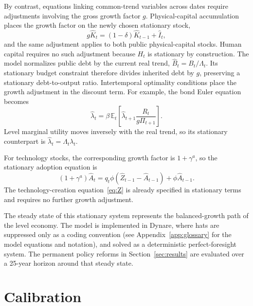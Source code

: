 \documentclass[a4paper,11pt]{article}
\begin{document}
By contrast, equations linking common-trend variables across dates require adjustments involving the gross growth factor $g$.
Physical-capital accumulation places the growth factor on the newly chosen stationary stock,
\begin{equation} \label{eq:capstat}
    g\hat{K}_t=(1-\delta)\hat{K}_{t-1}+\hat{I}_t,
\end{equation}
and the same adjustment applies to both public physical-capital stocks.
Human capital requires no such adjustment because $H_t$ is stationary by construction.
The model normalizes public debt by the current real trend, $\hat B_t=B_t/\Lambda_t$.
Its stationary budget constraint therefore divides inherited debt by $g$, preserving a stationary debt-to-output ratio.
Intertemporal optimality conditions place the growth adjustment in the discount term.
For example, the bond Euler equation becomes
\begin{equation} \label{eq:eulerstat}
    \hat{\lambda}_t = \beta\,\mathbb{E}_t\!\left[
    \hat{\lambda}_{t+1}\frac{R_t}{g\Pi_{t+1}}\right].
\end{equation}
Level marginal utility moves inversely with the real trend, so its stationary counterpart is $\hat{\lambda}_t=\Lambda_{t}\lambda_t$.

For technology stocks, the corresponding growth factor is $1+\gamma^a$, so the stationary adoption equation is
\begin{equation} \label{eq:adoptstat}
    (1+\gamma^a)\hat{A}_t
    =q_t\phi\left(\hat{Z}_{t-1}-\hat{A}_{t-1}\right)
    +\phi\hat{A}_{t-1}.
\end{equation}
The technology-creation equation~\eqref{eq:Z} is already specified in stationary terms and requires no further growth adjustment.

The steady state of this stationary system represents the balanced-growth path of the level economy.
The model is implemented in Dynare, where hats are suppressed only as a coding convention (see Appendix~\ref{app:glossary} for the model equations and notation), and solved as a deterministic perfect-foresight system.
The permanent policy reforms in Section~\ref{sec:results} are evaluated over a 25-year horizon around that steady state.

\section{Calibration} \label{sec:calibration}
\end{document}
